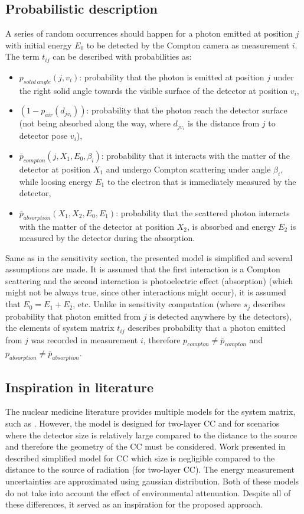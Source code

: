 \subsection{Probabilistic description}
A series of random occurrences should happen for a photon emitted at position $j$ with initial energy $E_{0}$ to be detected by the Compton camera as measurement $i$.
The term $t_{ij}$ can be described with probabilities as:
\begin{itemize}
  \item $p_{solid\ angle}(j, v_{i}) $: probability that the photon is emitted at position $j$ under the right solid angle towards the visible surface of the detector at position $v_{i}$,
  \item $(1-p_{air}(d_{jv_{i}}))$: probability that the photon reach the detector surface (not being absorbed along the way, where $d_{jv_{i}}$ is the distance from $j$ to detector pose $v_{i}$),
  \item $\bar{p}_{compton}(j, X_{1}, E_{0}, \beta_{i})$: probability that it interacts with the matter of the detector at position $X_{1}$ and undergo Compton scattering under angle $\beta_{i}$, while loosing energy $E_{1}$ to the electron that is immediately measured by the detector,
  \item $\bar{p}_{absorption}(X_{1}, X_{2}, E_{0}, E_{1})$: probability that the scattered photon interacts with the matter of the detector at position $X_{2}$, is absorbed and energy $E_{2}$ is measured by the detector during the absorption.
\end{itemize}
Same as in the sensitivity section, the presented model is simplified and several assumptions are made. 
It is assumed that the first interaction is a Compton scattering and the second interaction is photoelectric effect (absorption) (which might not be always true, since other interactions might occur), it is assumed that $E_{0} = E_{1} + E_{2}$, etc.
Unlike in sensitivity computation (where $s_{j}$ describes probability that photon emitted from $j$ is detected anywhere by the detectors), the elements of system matrix $t_{ij}$ describes probability that a photon emitted from $j$ was recorded in measurement $i$, therefore $p_{compton}\neq \bar{p}_{compton}$ and  $p_{absorption}\neq \bar{p}_{absorption}$.

\subsection{Inspiration in literature}
The nuclear medicine literature provides multiple models for the system matrix, such as \cite{wilderman}. 
However, the model is designed for two-layer \ac{CC} and for scenarios where the detector size is relatively large compared to the distance to the source and therefore the geometry of the \ac{CC} must be considered.
Work presented in \cite{maxim2016} described simplified model for \ac{CC} which size is negligible compared to the distance to the source of radiation (for two-layer \ac{CC}).
The energy measurement uncertainties are approximated using gaussian distribution.
Both of these models do not take into account the effect of environmental attenuation.
Despite all of these differences, it served as an inspiration for the proposed approach.

